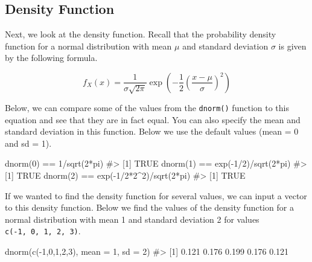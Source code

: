 \documentclass[
  letterpaper,
]{krantz}
\makeatletter
\newenvironment{Shaded}{\begin{snugshade}}{\end{snugshade}}
\newcommand{\AttributeTok}[1]{\textcolor[rgb]{0.40,0.45,0.13}{#1}}
\newcommand{\CommentTok}[1]{\textcolor[rgb]{0.37,0.37,0.37}{#1}}
\newcommand{\DecValTok}[1]{\textcolor[rgb]{0.68,0.00,0.00}{#1}}
\newcommand{\FunctionTok}[1]{\textcolor[rgb]{0.28,0.35,0.67}{#1}}
\newcommand{\NormalTok}[1]{\textcolor[rgb]{0.00,0.23,0.31}{#1}}
\newcommand{\SpecialCharTok}[1]{\textcolor[rgb]{0.37,0.37,0.37}{#1}}
\newenvironment{kframe}{%
\medskip{}
\setlength{\fboxsep}{.8em}
 \def\at@end@of@kframe{}%
 \ifinner\ifhmode%
  \def\at@end@of@kframe{\end{minipage}}%
  \begin{minipage}{\columnwidth}%
 \fi\fi%
 \def\FrameCommand##1{\hskip\@totalleftmargin \hskip-\fboxsep
 \colorbox{shadecolor}{##1}\hskip-\fboxsep
     \hskip-\linewidth \hskip-\@totalleftmargin \hskip\columnwidth}%
 \MakeFramed {\advance\hsize-\width
   \@totalleftmargin\z@ \linewidth\hsize
   \@setminipage}}%
 {\par\unskip\endMakeFramed%
 \at@end@of@kframe}
\renewenvironment{Shaded}{\begin{kframe}}{\end{kframe}}
\makeatother
\begin{document}
\hypertarget{density-function}{%
\subsection{Density Function}\label{density-function}}

Next, we look at the density function. Recall that the probability
density function for a normal distribution with mean \(\mu\) and
standard deviation \(\sigma\) is given by the following formula.

\[ f_X(x) = \frac{1}{\sigma \sqrt{2 \pi}} \exp \left(-\frac{1}{2} \left (\frac{x-\mu}{\sigma} \right)^2 \right) \]

Below, we can compare some of the values from the \texttt{dnorm()}
function to this equation and see that they are in fact equal. You can
also specify the mean and standard deviation in this function. Below we
use the default values (mean = 0 and sd = 1).

\begin{Shaded}
\begin{Highlighting}[]
\FunctionTok{dnorm}\NormalTok{(}\DecValTok{0}\NormalTok{) }\SpecialCharTok{==} \DecValTok{1}\SpecialCharTok{/}\FunctionTok{sqrt}\NormalTok{(}\DecValTok{2}\SpecialCharTok{*}\NormalTok{pi)}
\CommentTok{\#\textgreater{} [1] TRUE}
\FunctionTok{dnorm}\NormalTok{(}\DecValTok{1}\NormalTok{) }\SpecialCharTok{==} \FunctionTok{exp}\NormalTok{(}\SpecialCharTok{{-}}\DecValTok{1}\SpecialCharTok{/}\DecValTok{2}\NormalTok{)}\SpecialCharTok{/}\FunctionTok{sqrt}\NormalTok{(}\DecValTok{2}\SpecialCharTok{*}\NormalTok{pi)}
\CommentTok{\#\textgreater{} [1] TRUE}
\FunctionTok{dnorm}\NormalTok{(}\DecValTok{2}\NormalTok{) }\SpecialCharTok{==} \FunctionTok{exp}\NormalTok{(}\SpecialCharTok{{-}}\DecValTok{1}\SpecialCharTok{/}\DecValTok{2}\SpecialCharTok{*}\DecValTok{2}\SpecialCharTok{\^{}}\DecValTok{2}\NormalTok{)}\SpecialCharTok{/}\FunctionTok{sqrt}\NormalTok{(}\DecValTok{2}\SpecialCharTok{*}\NormalTok{pi)}
\CommentTok{\#\textgreater{} [1] TRUE}
\end{Highlighting}
\end{Shaded}

If we wanted to find the density function for several values, we can
input a vector to this density function. Below we find the values of the
density function for a normal distribution with mean 1 and standard
deviation 2 for values \texttt{c(-1,\ 0,\ 1,\ 2,\ 3)}.

\begin{Shaded}
\begin{Highlighting}[]
\FunctionTok{dnorm}\NormalTok{(}\FunctionTok{c}\NormalTok{(}\SpecialCharTok{{-}}\DecValTok{1}\NormalTok{,}\DecValTok{0}\NormalTok{,}\DecValTok{1}\NormalTok{,}\DecValTok{2}\NormalTok{,}\DecValTok{3}\NormalTok{), }\AttributeTok{mean =} \DecValTok{1}\NormalTok{, }\AttributeTok{sd =} \DecValTok{2}\NormalTok{)}
\CommentTok{\#\textgreater{} [1] 0.121 0.176 0.199 0.176 0.121}
\end{Highlighting}
\end{Shaded}
\end{document}
